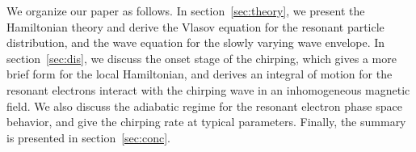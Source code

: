We organize our paper as follows. In section~\ref{sec:theory}, we present the Hamiltonian theory and derive the Vlasov equation for the resonant particle distribution, and the wave equation for the slowly varying wave envelope.
In section~\ref{sec:dis}, we discuss the onset stage of the chirping, which gives a more brief form for the local Hamiltonian, and derives an integral of motion for the resonant electrons interact with the chirping wave in an inhomogeneous magnetic field. We also discuss the adiabatic regime for the resonant electron phase space behavior, and give the chirping rate at typical parameters.  
Finally, the summary is presented in section~\ref{sec:conc}.
